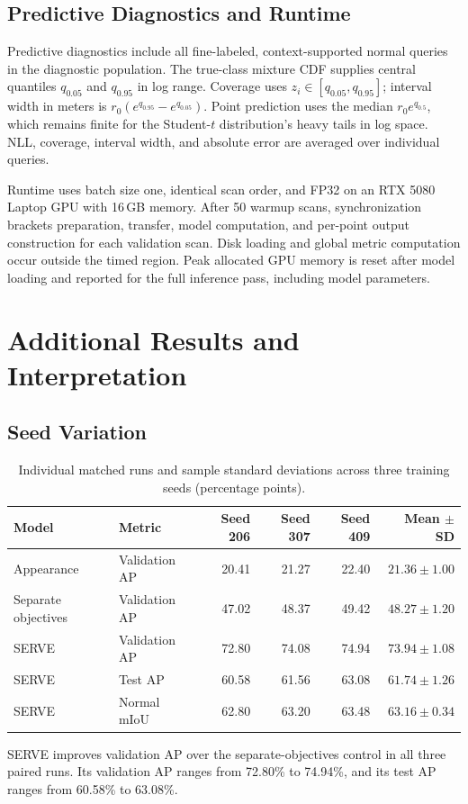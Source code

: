 \documentclass{article}
\begin{document}
\subsection{Predictive Diagnostics and Runtime}
Predictive diagnostics include all fine-labeled, context-supported normal queries in the diagnostic population. The true-class mixture CDF supplies central quantiles $q_{0.05}$ and $q_{0.95}$ in log range. Coverage uses $z_i\in[q_{0.05},q_{0.95}]$; interval width in meters is $r_0(e^{q_{0.95}}-e^{q_{0.05}})$. Point prediction uses the median $r_0e^{q_{0.5}}$, which remains finite for the Student-$t$ distribution's heavy tails in log space. NLL, coverage, interval width, and absolute error are averaged over individual queries.

Runtime uses batch size one, identical scan order, and FP32 on an RTX 5080 Laptop GPU with 16\,GB memory. After 50 warmup scans, synchronization brackets preparation, transfer, model computation, and per-point output construction for each validation scan. Disk loading and global metric computation occur outside the timed region. Peak allocated GPU memory is reset after model loading and reported for the full inference pass, including model parameters.

\section{Additional Results and Interpretation}
\label{app:results}
\subsection{Seed Variation}
\begin{table}[ht]
\centering
\caption{Individual matched runs and sample standard deviations across three training seeds (percentage points).}
\begin{tabular}{llrrrr}
\toprule
Model & Metric & Seed 206 & Seed 307 & Seed 409 & Mean $\pm$ SD\\
\midrule
Appearance & Validation AP & 20.41 & 21.27 & 22.40 & $21.36\pm1.00$\\
Separate objectives & Validation AP & 47.02 & 48.37 & 49.42 & $48.27\pm1.20$\\
SERVE & Validation AP & 72.80 & 74.08 & 74.94 & $73.94\pm1.08$\\
SERVE & Test AP & 60.58 & 61.56 & 63.08 & $61.74\pm1.26$\\
SERVE & Normal mIoU & 62.80 & 63.20 & 63.48 & $63.16\pm0.34$\\
\bottomrule
\end{tabular}
\end{table}
SERVE improves validation AP over the separate-objectives control in all three paired runs. Its validation AP ranges from 72.80\% to 74.94\%, and its test AP ranges from 60.58\% to 63.08\%.
\end{document}
